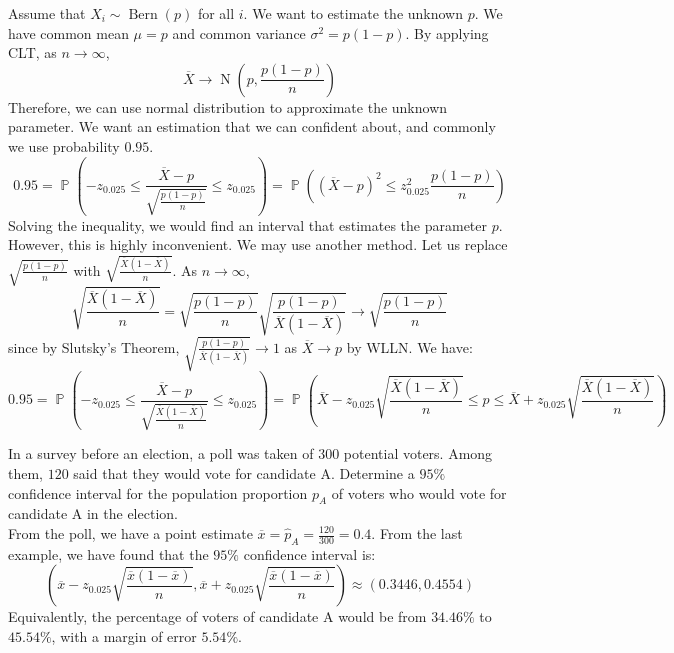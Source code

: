 \documentclass{huhtakm-template-book-v2}
\DeclareMathOperator{\prob}{\mathbb{P}}
\DeclareMathOperator{\Bern}{Bern}
\DeclareMathOperator{\N}{N}
\begin{document}
\newpage
\begin{eg}
	Assume that $X_{i}\sim\Bern(p)$ for all $i$. We want to estimate the unknown $p$. We have common mean $\mu=p$ and common variance $\sigma^{2}=p(1-p)$. By applying CLT, as $n\to\infty$,
	\begin{equation*}
		\overline{X}\to\N\left(p,\frac{p(1-p)}{n}\right)
	\end{equation*}
	Therefore, we can use normal distribution to approximate the unknown parameter. We want an estimation that we can confident about, and commonly we use probability $0.95$.
	\begin{equation*}
		0.95=\prob\left(-z_{0.025}\leq\frac{\overline{X}-p}{\sqrt{\frac{p(1-p)}{n}}}\leq z_{0.025}\right)=\prob\left((\overline{X}-p)^{2}\leq z_{0.025}^{2}\frac{p(1-p)}{n}\right)
	\end{equation*} 
	Solving the inequality, we would find an interval that estimates the parameter $p$. However, this is highly inconvenient. We may use another method. Let us replace $\sqrt{\frac{p(1-p)}{n}}$ with $\sqrt{\frac{\overline{X}(1-\overline{X})}{n}}$. As $n\to\infty$,
	\begin{equation*}
		\sqrt{\frac{\overline{X}(1-\overline{X})}{n}}=\sqrt{\frac{p(1-p)}{n}}\sqrt{\frac{p(1-p)}{\overline{X}(1-\overline{X})}}\to\sqrt{\frac{p(1-p)}{n}}
	\end{equation*}
	since by Slutsky's Theorem, $\sqrt{\frac{p(1-p)}{\overline{X}(1-\overline{X})}}\to 1$ as $\overline{X}\to p$ by WLLN. We have:
	\begin{equation*}
		0.95=\prob\left(-z_{0.025}\leq\frac{\overline{X}-p}{\sqrt{\frac{\overline{X}(1-\overline{X})}{n}}}\leq z_{0.025}\right)=\prob\left(\overline{X}-z_{0.025}\sqrt{\frac{\overline{X}(1-\overline{X})}{n}}\leq p\leq\overline{X}+z_{0.025}\sqrt{\frac{\overline{X}(1-\overline{X})}{n}}\right)
	\end{equation*} 
\end{eg}
\begin{eg}
	In a survey before an election, a poll was taken of $300$ potential voters. Among them, $120$ said that they would vote for candidate A. Determine a $95\%$ confidence interval for the population proportion $p_{A}$ of voters who would vote for candidate A in the election.\\
	From the poll, we have a point estimate $\overline{x}=\hat{p}_{A}=\frac{120}{300}=0.4$. From the last example, we have found that the $95\%$ confidence interval is:
	\begin{equation*}
		\left(\overline{x}-z_{0.025}\sqrt{\frac{\overline{x}(1-\overline{x})}{n}},\overline{x}+z_{0.025}\sqrt{\frac{\overline{x}(1-\overline{x})}{n}}\right)\approx(0.3446,0.4554)
	\end{equation*}
	Equivalently, the percentage of voters of candidate A would be from $34.46\%$ to $45.54\%$, with a margin of error $5.54\%$.
\end{eg}
\end{document}
